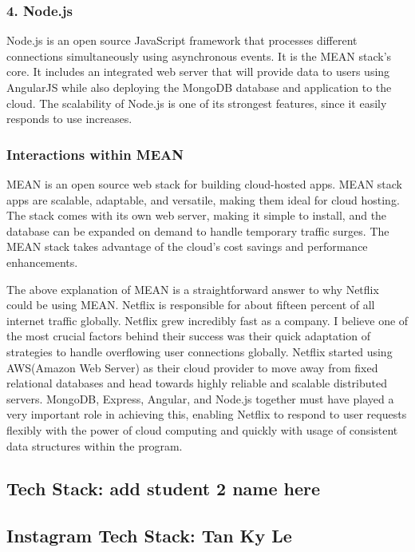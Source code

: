 \documentclass[a4paper, 11pt]{report}
\begin{document}
\subsubsection{4. Node.js}
Node.js is an open source JavaScript framework that processes different connections simultaneously using asynchronous events.\cite{isaac8}  It is the MEAN stack's core. It includes an integrated web server that will provide data to users using AngularJS while also deploying the MongoDB database and application to the cloud.\cite{isaac8} The scalability of Node.js is one of its strongest features, since it easily responds to use increases.

\subsubsection{Interactions within MEAN}
MEAN is an open source web stack for building cloud-hosted apps. MEAN stack apps are scalable, adaptable, and versatile, making them ideal for cloud hosting.\cite{isaac8} The stack comes with its own web server, making it simple to install, and the database can be expanded on demand to handle temporary traffic surges. \cite{isaac8} The MEAN stack takes advantage of the cloud's cost savings and performance enhancements.\cite{isaac8} 

The above explanation of MEAN is a straightforward answer to why Netflix could be using MEAN. Netflix is responsible for about fifteen percent of all internet traffic globally. Netflix grew incredibly fast as a company. I believe one of the most crucial factors behind their success was their quick adaptation of strategies to handle overflowing user connections globally. Netflix started using AWS(Amazon Web Server) as their cloud provider to move away from fixed relational databases and head towards highly reliable and scalable distributed servers.\cite{isaac11}  MongoDB, Express, Angular, and Node.js together must have played a very important role in achieving this, enabling Netflix to respond to user requests flexibly with the power of cloud computing and quickly with usage of consistent data structures within the program.


\subsection{Tech Stack: add student 2 name here}


\subsection{ Instagram Tech Stack: Tan Ky Le}
\end{document}
